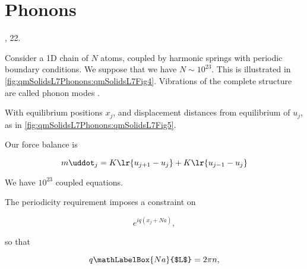%
%
\section{Phonons}

\reading \citep{ashcroft1976solid} , 22.

Consider a 1D chain of $N$ atoms, coupled by harmonic springs  with periodic boundary conditions.  We suppose that we have $N \sim 10^{23}$.  This is illustrated in \cref{fig:qmSolidsL7Phonons:qmSolidsL7Fig4}.  Vibrations of the complete structure are called phonon modes .


With equilibrium positions $x_j$, and displacement distances from equilibrium of $u_j$, as in \cref{fig:qmSolidsL7Phonons:qmSolidsL7Fig5}.


Our force balance is

\begin{dmath}\label{eqn:condensedMatterLecture7Phonons:180}
m \uddot_j = K \lr{ u_{j + 1} - u_j } + K \lr{ u_{j - 1} - u_j} 
\end{dmath}

We have $10^{23}$ coupled equations.

The periodicity requirement imposes a constraint on

\begin{dmath}\label{eqn:condensedMatterLecture7Phonons:220}
e^{i q( x_j + N a) },
\end{dmath}

so that 

\begin{dmath}\label{eqn:condensedMatterLecture7Phonons:240}
q \mathLabelBox{N a}{$L$} = 2 \pi n,
\end{dmath}

